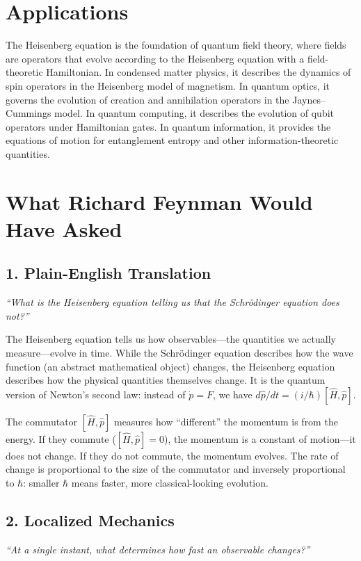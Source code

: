 \documentclass[11pt,openright]{book}
\begin{document}
\section*{Applications}

The Heisenberg equation is the foundation of quantum field theory, where fields are operators that evolve according to the Heisenberg equation with a field-theoretic Hamiltonian. In condensed matter physics, it describes the dynamics of spin operators in the Heisenberg model of magnetism. In quantum optics, it governs the evolution of creation and annihilation operators in the Jaynes--Cummings model. In quantum computing, it describes the evolution of qubit operators under Hamiltonian gates. In quantum information, it provides the equations of motion for entanglement entropy and other information-theoretic quantities.
\section*{What Richard Feynman Would Have Asked}

\subsection*{1. Plain-English Translation}
\textit{``What is the Heisenberg equation telling us that the Schr\"odinger equation does not?''}

The Heisenberg equation tells us how observables---the quantities we actually measure---evolve in time. While the Schr\"odinger equation describes how the wave function (an abstract mathematical object) changes, the Heisenberg equation describes how the physical quantities themselves change. It is the quantum version of Newton's second law: instead of $\dot{p} = F$, we have $d\hat{p}/dt = (i/\hbar)[\hat{H}, \hat{p}]$.

The commutator $[\hat{H}, \hat{p}]$ measures how ``different'' the momentum is from the energy. If they commute ($[\hat{H}, \hat{p}] = 0$), the momentum is a constant of motion---it does not change. If they do not commute, the momentum evolves. The rate of change is proportional to the size of the commutator and inversely proportional to $\hbar$: smaller $\hbar$ means faster, more classical-looking evolution.

\subsection*{2. Localized Mechanics}
\textit{``At a single instant, what determines how fast an observable changes?''}
\end{document}
